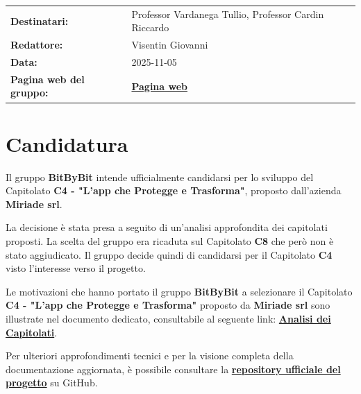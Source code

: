 \documentclass[a4paper,12pt]{article}
\begin{document}
\begin{tcolorbox}
\begin{tabularx}{\textwidth}{@{}l X@{}}
\textbf{Destinatari:} & Professor Vardanega Tullio, Professor Cardin Riccardo \\
\textbf{Redattore:} & Visentin Giovanni \\
\textbf{Data:} & 2025-11-05 \\
\textbf{Pagina web del gruppo:} & \href{https://swe-bitbybit.github.io/SWE-project/}{\textbf{Pagina web}} \\
\end{tabularx}
\end{tcolorbox}

\clearpage

\vspace{0.5cm}

\vspace{0.8cm}

\clearpage
\tableofcontents
\thispagestyle{empty} %
\clearpage

\section{Candidatura}
Il gruppo \textbf{BitByBit} intende ufficialmente candidarsi per lo sviluppo del Capitolato \textbf{C4 - "L'app che Protegge e Trasforma"}, proposto dall’azienda \textbf{Miriade srl}.

La decisione è stata presa a seguito di un’analisi approfondita dei capitolati proposti. La scelta del gruppo era ricaduta sul Capitolato \textbf{C8} che però non è stato aggiudicato. Il gruppo decide quindi di candidarsi per il Capitolato \textbf{C4} visto l'interesse verso il progetto. 

Le motivazioni che hanno portato il gruppo \textbf{BitByBit} a selezionare il Capitolato \textbf{C4 - "L'app che Protegge e Trasforma"} proposto da \textbf{Miriade srl} sono illustrate nel documento dedicato, consultabile al seguente link: 
\href{https://swe-bitbybit.github.io/SWE-project/docs/candidatura/valutazione_capitolati/valutazione_capitolati_seconda_candidatura.pdf}{\textbf{Analisi dei Capitolati}}.

Per ulteriori approfondimenti tecnici e per la visione completa della documentazione aggiornata, è possibile consultare la \href{https://github.com/SWE-BitByBit/SWE-project.git}{\textbf{repository ufficiale del progetto}} su GitHub.
\end{document}
